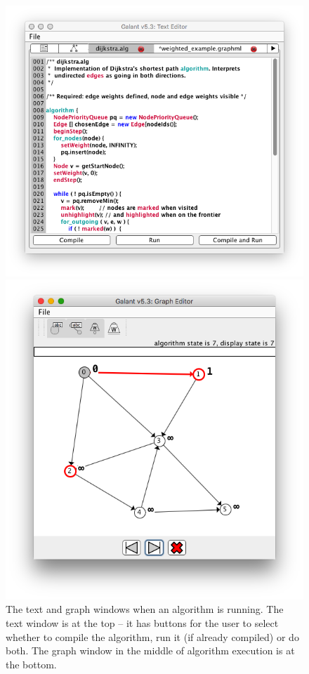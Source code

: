\begin{figure}
  \begin{center}
  \includegraphics[scale=0.45]{X-dijkstra_text}

  \includegraphics[scale=0.45]{X-dijkstra_running}
  \end{center}

  \caption{The text and graph windows when an algorithm is running. The text
    window is at the top -- it has buttons for the user to select
    whether to compile the algorithm, run it (if already compiled) or do
    both. The graph window in the middle of algorithm execution is at
    the bottom.}
  \label{fig:dijkstra_running}
\end{figure}

